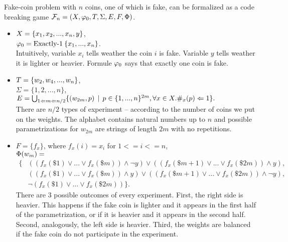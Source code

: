 \begin{example} \label{form-fake-coin1}
Fake-coin problem with $n$ coins, one of which is fake, can be formalized as
a code breaking game
$\mathcal{F}_n = (X, \varphi_0, T, \Sigma, E, F, \Phi)$.

\begin{itemize}
\item
$X = \{x_1, x_2, ..., x_n, y\}$, \\
$\varphi_0 = \textrm{Exactly-1}\:\{x_1, ..., x_n\}$. \\
Intuitively, variable $x_i$ tells weather the coin $i$ is fake.
Variable $y$ tells weather it is lighter or heavier.
Formule $\varphi_0$ says that exactly one coin is fake.

\item
$T = \{ w_2, w_4, ..., w_n \}$, \\
$\Sigma = \{1, 2,...,n\}$, \\
$E = \bigcup_{1<=m<=n/2} \{ (w_{2m}, p) \:\:|\:\:
  p \in \{1,...,n\}^{2m}, \forall x\in X. \#_x(p)<=1 \}. $\\
There are $n/2$ types of experiment -- according to the number of coins we put on the weights.
The alphabet contains natural numbers up to $n$ and
possible parametrizations for $w_{2m}$ are strings of length $2m$ with no repetitions.

\item
$F = \{ f_x \}$, where $f_x(i) = x_i$ for $1 <= i <= n$, \\
$\Phi(w_m) = $ \vspace{-4mm}
\begin{align*}
  \big\{
& ((f_x(\$1) \vee ... \vee f_x(\$m)) \wedge \neg y) \vee ((f_x(\$m+1) \vee ... \vee f_x(\$2m)) \wedge y), \\
& ((f_x(\$1) \vee ... \vee f_x(\$m)) \wedge y) \vee ((f_x(\$m+1) \vee ... \vee f_x(\$2m)) \wedge \neg y), \\
& \neg (f_x(\$1) \vee ... \vee f_x(\$2m)) \big\}.
\end{align*}
There are 3 possible outcomes of every experiment.
First, the right side is heavier. This happens if the fake coin is lighter and it appears in the first half of the parametrization, or if it is heavier and it appears in the second half. Second, analogously, the left side is heavier.
Third, the weights are balanced if the fake coin do not participate in the experiment.
\end{itemize}
\end{example}
\newpage

